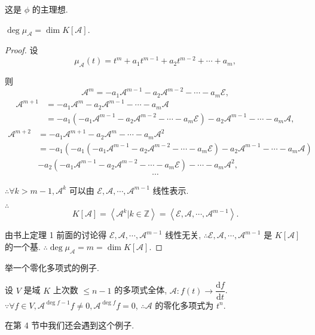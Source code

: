 \documentclass{ctexart}
\begin{document}
这是 $\phi$ 的主理想.
\begin{theorem}
    $\deg\mu_\mathcal{A}=\dim K[\mathcal{A}]$.
\end{theorem}
\begin{proof}
    设
    \[\mu_\mathcal{A}(t)=t^m+a_1t^{m-1}+a_2t^{m-2}+\cdots+a_m,\]

    则
    \[\mathcal{A}^m=-a_1\mathcal{A}^{m-1}-a_2\mathcal{A}^{m-2}-\cdots-a_m\mathcal{E},\]
    \begin{align*}
        \mathcal{A}^{m+1} & =-a_1\mathcal{A}^{m}-a_2\mathcal{A}^{m-1}-\cdots-a_m\mathcal{A} \\
        & =-a_1(-a_1\mathcal{A}^{m-1}-a_2\mathcal{A}^{m-2}-\cdots-a_m\mathcal{E})-a_2\mathcal{A}^{m-1}-\cdots-a_m\mathcal{A},
    \end{align*}
    \begin{align*}
        \mathcal{A}^{m+2} & =-a_1\mathcal{A}^{m+1}-a_2\mathcal{A}^m-\cdots-a_m\mathcal{A}^2 \\
        & =-a_1(-a_1(-a_1\mathcal{A}^{m-1}-a_2\mathcal{A}^{m-2}-\cdots-a_m\mathcal{E})-a_2\mathcal{A}^{m-1}-\cdots-a_m\mathcal{A}) \\
        & -a_2(-a_1\mathcal{A}^{m-1}-a_2\mathcal{A}^{m-2}-\cdots-a_m\mathcal{E})-\cdots-a_m\mathcal{A^2},
    \end{align*}
    \[\cdots\]

    $\therefore\forall k>m-1,\mathcal{A}^k$ 可以由 $\mathcal{E},\mathcal{A},\cdots,\mathcal{A}^{m-1}$ 线性表示.

    $\therefore$
    \[K[\mathcal{A}]=\left<\mathcal{A}^k|k\in\mathbb{Z}\right>=\left<\mathcal{E},\mathcal{A},\cdots,\mathcal{A}^{m-1}\right>.\]

    由书上定理 1 前面的讨论得 $\mathcal{E},\mathcal{A},\cdots,\mathcal{A}^{m-1}$ 线性无关, $\therefore\mathcal{E},\mathcal{A},\cdots,\mathcal{A}^{m-1}$ 是 $K[\mathcal{A}]$ 的一个基. $\therefore\deg\mu_\mathcal{A}=m=\dim K[\mathcal{A}]$.
\end{proof}
举一个零化多项式的例子.
\begin{example}\label{ex2.2}
    设 $V$ 是域 $K$ 上次数 $\leq n-1$ 的多项式全体, $\mathcal{A}:f(t)\to\dfrac{\mathrm{d}f}{\mathrm{d}t}$. $\because\forall f\in V,\mathcal{A}^{\deg f-1}f\neq0,\mathcal{A}^{\deg f}f=0$, $\therefore\mathcal{A}$ 的零化多项式为 $t^n$.
\end{example}
在第 4 节中我们还会遇到这个例子.
\end{document}
